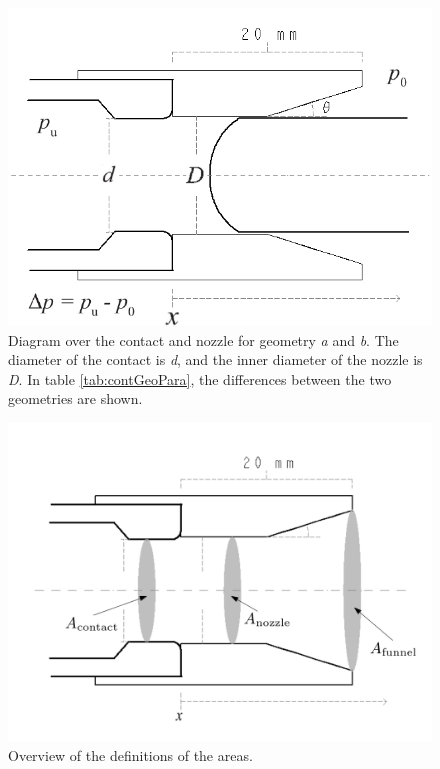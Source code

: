 \documentclass[10pt,b5paper,twoside]{article}
\begin{document}
\begin{figure} [h]
\centering
\includegraphics[scale=0.45]{Bilder/Method/ContactAndNozzleFunnelShape5.png}
\caption{Diagram over the contact and nozzle for geometry \textit{a} and \textit{b}. The diameter of the contact is \textit{d}, and the inner diameter of the nozzle is \textit{D}. In table \ref{tab:contGeoPara}, the differences between the two geometries are shown.} \label{fig:contactAndNozzle}
\end{figure}

\begin{figure} [H] %
\centering
\includegraphics[scale=0.30]{Bilder/Method/AreaDef.png}
\caption{Overview of the definitions of the areas.} \label{fig:AreacontactAndNozzle}
\end{figure}
\end{document}
